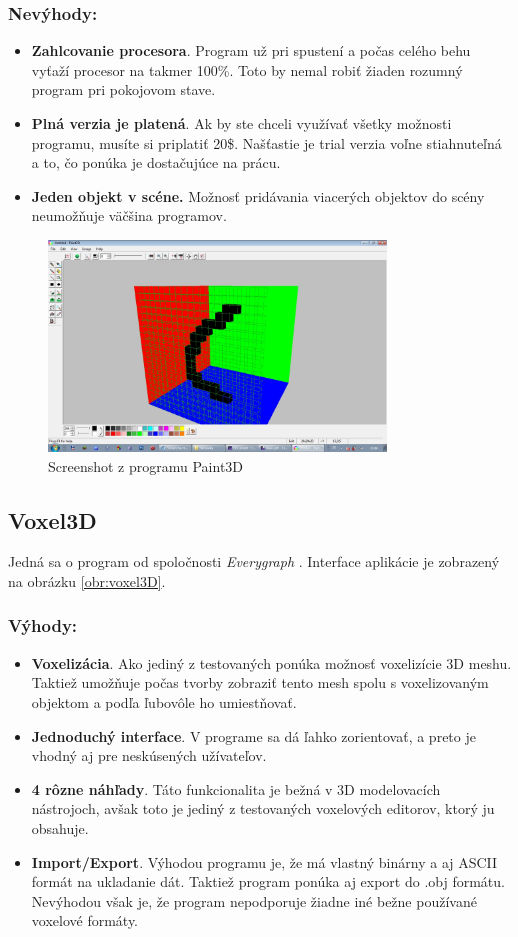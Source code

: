 \subsubsection{Nevýhody:}
\begin{itemize}
	\item \textbf{Zahlcovanie procesora}. Program už pri spustení a počas celého behu vyťaží procesor na takmer 100\%. Toto by nemal robiť žiaden rozumný program pri pokojovom stave.
	\item \textbf{Plná verzia je platená}. Ak by ste chceli využívať všetky možnosti programu, musíte si priplatiť 20\$. Našťastie je trial verzia voľne stiahnuteľná a to, čo ponúka je dostačujúce na prácu.
	\item \textbf{Jeden objekt v scéne.} Možnosť pridávania viacerých objektov do scény neumožňuje väčšina programov.
\end{itemize}
\begin{figure}[ht!]
	\centering
	\includegraphics[width=0.8\textwidth]{paint3D.jpg}
	\caption[Paint3D]{Screenshot z programu Paint3D}
	\label{obr:paint3D}
\end{figure}


\subsection{Voxel3D}
Jedná sa o program od spoločnosti \textit{Everygraph} \cite{voxel3d}. Interface aplikácie je zobrazený na obrázku \ref{obr:voxel3D}.
\subsubsection{Výhody:}
\begin{itemize}
	\item \textbf{Voxelizácia}. Ako jediný z testovaných ponúka možnosť voxelizície 3D meshu. Taktiež umožňuje počas tvorby zobraziť tento mesh spolu s voxelizovaným objektom a podľa ľubovôle ho umiestňovať. 
	\item \textbf{Jednoduchý interface}. V programe sa dá ľahko zorientovať, a preto je vhodný aj pre neskúsených užívateľov.
	\item \textbf{4 rôzne náhľady}. Táto funkcionalita je bežná v 3D modelovacích nástrojoch, avšak toto je jediný z testovaných voxelových editorov, ktorý ju obsahuje.
	\item \textbf{Import/Export}. Výhodou programu je, že má vlastný binárny a aj ASCII formát na ukladanie dát. Taktiež program ponúka aj export do .obj formátu. Nevýhodou však je, že program nepodporuje žiadne iné bežne používané voxelové formáty.
\end{itemize}
